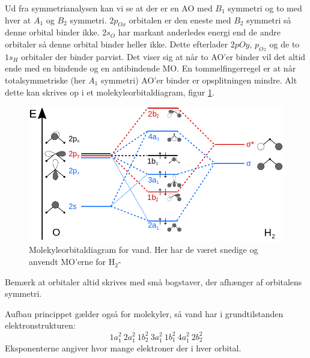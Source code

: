 \documentclass[../../Atom-ogMolekylefysik.tex]{subfiles}
\begin{document}
Ud fra symmetrianalysen kan vi se at der er en AO med $B_1$ symmetri og to med hver at $A_1$ og $B_2$ symmetri.
$2p_{Ox}$ orbitalen er den eneste med $B_2$ symmetri så denne orbital binder ikke. $2s_O$ har markant anderledes energi end de andre orbitaler så denne orbital binder heller ikke. Dette efterlader $2p{Oy}$, $p_{Oz}$ og de to $1s_H$ orbitaler der binder parvist. Det viser sig at når to AO'er binder vil det altid ende med en bindende og en antibindende MO. En tommelfingerregel er at når totalsymmetriske (her $A_1$ symmetri) AO'er binder er opsplitningen mindre.
Alt dette kan skrives op i et molekyleorbitaldiagram, figur \ref{fig:amo:MOvand}.
\begin{figure}
    \centering
    \includegraphics[width = \textwidth]{Atom-ogMolekylefysik/billeder/H2O-MO-Diagram.png}
    \caption{Molekyleorbitaldiagram for vand. Her har de været snedige og anvendt MO'erne for H$_2$-}
    \label{fig:amo:MOvand}
\end{figure}
Bemærk at orbitaler altid skrives med små bogstaver, der afhænger af orbitalens symmetri.

Aufbau princippet gælder også for molekyler, så vand har i grundtilstanden elektronstrukturen:
$$
1a_1^2~2a_1^2~1b_2^2~3a_1^2~1b_1^2~4a_1^2~2b_2^2
$$
Eksponenterne angiver hvor mange elektroner der i hver orbital.
\end{document}
